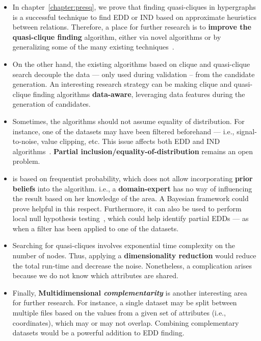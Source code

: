 \begin{itemize}
    \item In chapter~\ref{chapter:presq}, we prove that finding quasi-cliques in hypergraphs
    is a successful technique to find \gls{EDD} or \gls{IND} based on approximate heuristics
    between relations. Therefore, a place for further research is to
    \textbf{improve the quasi-clique finding} algorithm, either via novel algorithms or by
    generalizing some of the many existing techniques~\cite{WU2015693}.
            
    \item On the other hand, the existing algorithms based on clique and quasi-clique search
    decouple the data --- only used during validation -- from the candidate generation.
    An interesting research strategy can be making clique and quasi-clique finding algorithms \textbf{data-aware},
    leveraging data features during the generation of candidates.
    
    \item Sometimes, the algorithms should not assume equality of distribution. For instance, one of the
    datasets may have been filtered beforehand --- i.e., signal-to-noise, value clipping, etc. This issue affects
    both \gls{EDD} and \gls{IND} algorithms~\cite{koeller2003discovery}. \textbf{Partial inclusion/equality-of-distribution}
    remains an open problem.
            
    \item \PresQ is based on frequentist probability, which does not allow incorporating \textbf{prior beliefs}
    into the algorithm. i.e., a \textbf{domain-expert} has no way of influencing the result based
    on her knowledge of the area.
    A Bayesian framework could prove helpful in this respect. Furthermore,
    it can also be used to perform local null hypothesis testing~\cite{soriano2015bayesian}, which could help
    identify partial \glspl{EDD} --- as when a filter has been applied to one of the datasets.
    
    \item Searching for quasi-cliques involves exponential time complexity on the number of nodes.
    Thus, applying a \textbf{dimensionality reduction} would reduce the total
    run-time and decrease the noise. Nonetheless, a complication arises because
    we do not know which attributes are shared.
        
    \item Finally, \textbf{Multidimensional \emph{complementarity}} is another interesting
    area for further research. For instance, a single dataset may be split between multiple files
    based on the values from a given set of attributes (i.e., coordinates), which may or may not overlap.
    Combining complementary datasets would be a powerful addition to \gls{EDD} finding.
\end{itemize}

